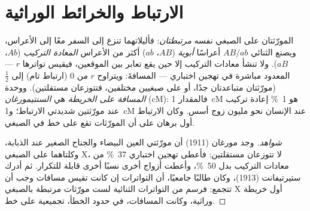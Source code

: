 \section{الارتباط والخرائط الوراثية}

\begin{definition}\label{def:b2:meiosis-heredity:linkage}
المورّثتان على الصبغي نفسه \emph{مرتبطتان}: فأليلاتهما تنزع إلى
السفر معًا إلى الأعراس، ويصنع الثنائي
$AB/ab$ أعراسًا \emph{أبوية} ($AB$، $ab$) أكثر من الأعراس
\emph{المعادة التركيب} ($Ab$، $aB$). ولا تنشأ معادات التركيب إلا حين
يقع تعابر بين الموقعين، فيقيس تواترها $r$ --- المعدود مباشرة في
تهجين اختباري --- المسافةَ: ويتراوح $r$ من 0 (ارتباط تام) إلى
$\tfrac12$ (مورّثتان متباعدتان جدًا، أو على صبغيين مختلفين، فتتوزعان
مستقلتين). ووحدة \emph{المسافة على الخريطة} هي \emph{السنتيمورغان}
(cM): فالمقدار \qty{1}{cM} هو \qty{1}{\%} إعادة تركيب عند مورّثتين شديدتي
الارتباط؛ و\qty{1}{cM} عند الإنسان نحو مليون زوج أسس. وكان الارتباط أول
برهان على أن المورّثات تقع على خط في الصبغي.
\end{definition}
\begin{proof}[شواهد]
وجد مورغان (1911) أن مورّثتي العين البيضاء والجناح الصغير عند
الذبابة، وكلتاهما على الصبغي X، لا تتوزعان مستقلتين: فأعطى تهجين
اختباري \qty{37}{\%} من معادات التركيب بدل \qty{50}{\%}،
وأعطت أزواج أخرى نسبًا أخرى قابلة للتكرار. ثم أدرك ستيرتيفانت
(1913)، وكان طالبًا جامعيًا، أن التواترات إن كانت تقيس مسافات وجب
أن تتجمع: فرسم من التواترات الثنائية لست مورّثات مرتبطة بالصبغي X
أول خريطة وراثية، وكانت المسافات، في حدود الخطأ، تجميعية على خط.
\end{proof}

